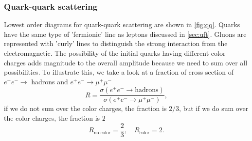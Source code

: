 \subsubsection*{Quark-quark scattering}
Lowest order diagrams for quark-quark scattering are shown in \cref{fig:qq}.
Quarks have the same type of 'fermionic' line as leptons discussed in \cref{sec:qft}.
Gluons are represented with 'curly' lines to distinguish the strong interaction from the electromagnetic.
The possibility of the initial quarks having different color charges adds magnitude to the overall amplitude because we need to sum over all possibilities. 
To illustrate this, we take a look at a fraction of cross section of $e^+ e^- \rightarrow$ hadrons and $e^+ e^- \rightarrow \mu^+ \mu^-$
\begin{equation}
    R = \frac{\sigma(e^+ e^- \rightarrow \text{hadrons})}{\sigma(e^+ e^- \rightarrow \mu^+ \mu^-)},
\end{equation}
if we do not sum over the color charges, the fraction is $2/3$, but if we do sum over the color charges, the fraction is $2$
\begin{equation}
    R_{\text{no color}} = \frac{2}{3}, \quad R_{\text{color}} = 2.
\end{equation}


